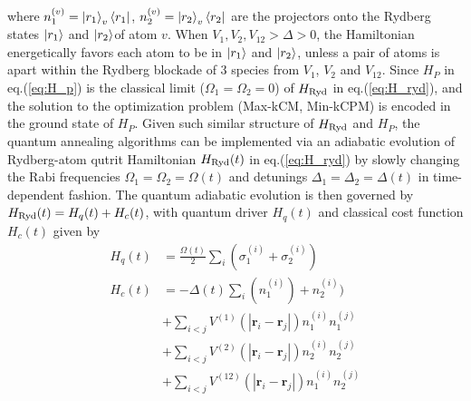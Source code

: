 \documentclass[%
 reprint,
nofootinbib,
 amsmath,amssymb,
 aps,
pra,
floatfix,
]{revtex4-2}
\begin{document}
where $n^{(v)}_1 = \ket{r_1}_v \bra{r_1}$, $n^{(v)}_2 = \ket{r_2}_v \bra{r_2}$ are the projectors onto the Rydberg states $\ket{r_1}$ and $\ket{r_2}$of atom $v$. When $ V_1, V_2, V_{12} > \Delta > 0$, the Hamiltonian energetically favors each atom to be in $\ket{r_1}$ and $\ket{r_2}$, unless a pair of atoms is apart within the Rydberg blockade of 3 species from $V_1$, $V_2$ and $V_{12}$. Since $H_P$ in eq.(\ref{eq:H_p}) is the classical limit ($\Omega_1 = \Omega_2 =0$) of $H_{\rm Ryd}$ in eq.(\ref{eq:H_ryd}), and the solution to the optimization problem (Max-kCM, Min-kCPM) is encoded in the ground state of $H_P$. Given such similar structure of $H_{\rm Ryd}$ and $H_P$, the quantum annealing algorithms can be implemented via an adiabatic evolution of Rydberg-atom qutrit Hamiltonian $H_{\rm Ryd}(t)$ in eq.(\ref{eq:H_ryd}) by slowly changing the Rabi frequencies $\Omega_1 = \Omega_2 = \Omega(t)$ and detunings $\Delta_1 = \Delta_2 = \Delta(t)$ in time-dependent fashion. The quantum adiabatic evolution is then governed by $H_{\rm Ryd}(t) = H_q(t) + H_c(t)$, with quantum driver $H_q(t)$ and classical cost function $H_c(t)$ given by
\begin{align}\label{eq:H_Ryd_t}
H_q(t) &=  \frac{\Omega(t)}{2}\sum_{i} (\sigma^{(i)}_1 + \sigma^{(i)}_2) \\
H_c(t) &= -\Delta(t) \sum_{i} (n^{(i)}_1 ) +  n^{(i)}_2)  \\ 
&+ \sum_{i<j} V^{(1)}(|\boldsymbol{r}_i - \boldsymbol{r}_j|) n^{(i)}_1 n^{(j)}_1  \nonumber \\ 
&+ \sum_{i<j} V^{(2)}(|\boldsymbol{r}_i - \boldsymbol{r}_j|) n^{(i)}_2 n^{(j)}_2 \nonumber \\
&+ \sum_{i<j} V^{(12)}(|\boldsymbol{r}_i - \boldsymbol{r}_j|) n^{(i)}_1 n^{(j)}_2 \nonumber
\end{align}
\end{document}
